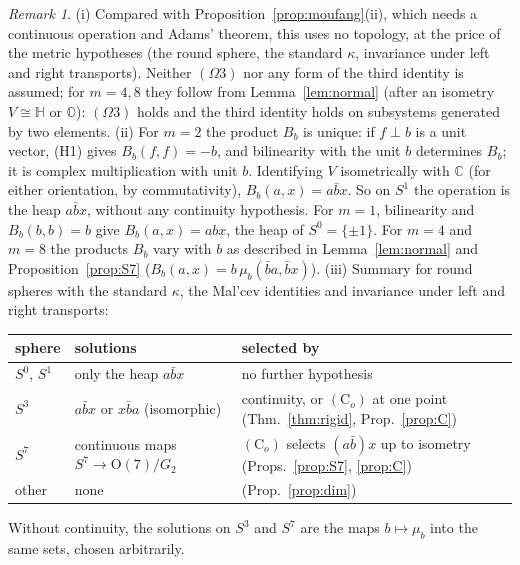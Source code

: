 \documentclass[11pt,reqno]{amsart}
\theoremstyle{definition}
\theoremstyle{remark}
\newtheorem{remark}[theorem]{Remark}
\numberwithin{equation}{section}
\newcommand{\C}{\mathbb{C}}
\newcommand{\HH}{\mathbb{H}}
\newcommand{\OO}{\mathrm{O}}
\begin{document}
\begin{remark}\label{rem:dim}
(i) Compared with Proposition~\ref{prop:moufang}(ii), which needs a continuous operation and Adams' theorem, this uses no topology,
at the price of the metric hypotheses (the round sphere, the standard $\kappa$, invariance under left and right transports).  Neither
$(\Omega3)$ nor any form of the third identity is assumed; for $m=4,8$ they follow from Lemma~\ref{lem:normal} (after an isometry $V\cong\HH$
or $\mathbb O$): $(\Omega3)$ holds and the third identity holds on subsystems generated by two elements.  (ii) For $m=2$ the product $B_b$ is
unique: if $f\perp b$ is a unit vector, (H1) gives $B_b(f,f)=-b$, and bilinearity with the unit $b$ determines $B_b$; it is complex
multiplication with unit $b$.  Identifying $V$ isometrically with $\C$ (for either orientation, by commutativity),
$B_b(a,x)=a\bar bx$.  So on $S^1$ the operation is the heap $a\bar bx$, without any continuity hypothesis.  For $m=1$, bilinearity and
$B_b(b,b)=b$ give $B_b(a,x)=abx$, the heap of $S^0=\{\pm1\}$.  For $m=4$ and $m=8$ the products $B_b$ vary with $b$ as described in
Lemma~\ref{lem:normal} and Proposition~\ref{prop:S7} ($B_b(a,x)=b\,\mu_b(\bar ba,\bar bx)$).  (iii) Summary for round spheres with the standard
$\kappa$, the Mal'cev identities and invariance under left and right transports:
\begin{center}\small
\begin{tabular}{@{}lll@{}}
\toprule
sphere & solutions & selected by\\
\midrule
$S^0$, $S^1$ & only the heap $a\bar bx$ & no further hypothesis\\
$S^3$ & $a\bar bx$ or $x\bar ba$ (isomorphic) & continuity, or $(\mathrm C_o)$ at one point (Thm.~\ref{thm:rigid}, Prop.~\ref{prop:C})\\
$S^7$ & continuous maps $S^7\to\OO(7)/G_2$ & $(\mathrm C_o)$ selects $(a\bar b)x$ up to isometry (Props.~\ref{prop:S7}, \ref{prop:C})\\
other & none & (Prop.~\ref{prop:dim})\\
\bottomrule
\end{tabular}
\end{center}
Without continuity, the solutions on $S^3$ and $S^7$ are the maps $b\mapsto\mu_b$ into the same sets, chosen arbitrarily.
\end{remark}
\end{document}
